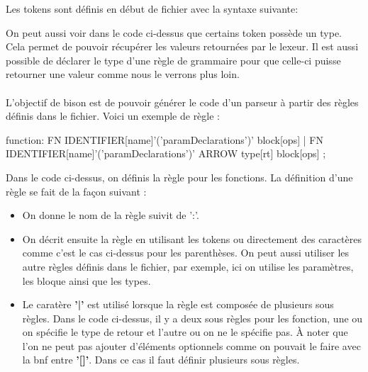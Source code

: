 \documentclass[a4paper]{article}%
\begin{document}
Les tokens sont définis en début de fichier avec la syntaxe suivante:

\begin{code}
\end{code}\leavevmode\newline


On peut aussi voir dans le code ci-dessus que certains token possède un type.
Cela permet de pouvoir récupérer les valeurs retournées par le lexeur. Il est
aussi possible de déclarer le type d'une règle de grammaire pour que celle-ci
puisse retourner une valeur comme nous le verrons plus loin.\\~\\


L'objectif de bison est de pouvoir générer le code d'un parseur à partir des
règles définis dans le fichier. Voici un exemple de règle :

\begin{code}[language=c++]
function:
        FN IDENTIFIER[name]'('paramDeclarations')' block[ops]
        |
        FN IDENTIFIER[name]'('paramDeclarations')' ARROW type[rt] block[ops]
        ;
\end{code}\leavevmode\newline

Dans le code ci-dessus, on définis la règle pour les fonctions. La définition
d'une règle se fait de la façon suivant :

\begin{itemize}
  \item On donne le nom de la règle suivit de ':'.
  \item On décrit ensuite la règle en utilisant les tokens ou directement des
    caractères comme c'est le cas ci-dessus pour les parenthèses. On peut aussi
    utiliser les autre règles définis dans le fichier, par exemple, ici on
    utilise les paramètres, les bloque ainsi que les types.
  \item Le caratère \textbf{'|'} est utilisé lorsque la règle est composée de
    plusieurs sous règles. Dans le code ci-dessus, il y a deux sous règles pour
    les fonction, une ou on spécifie le type de retour et l'autre ou on ne le
    spécifie pas. À noter que l'on ne peut pas ajouter d'éléments optionnels
    comme on pouvait le faire avec la \gls{bnf} entre \textbf{'[]'}. Dans ce cas
    il faut définir plusieurs sous règles.
\end{itemize}~\\
\end{document}
